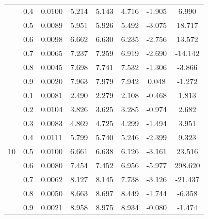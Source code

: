 \documentclass[11pt,a4paper]{report}
\begin{document}
\begin{longtable}{ | c | c || c | c | c | c | c | c | }
 & 0.4 & 0.0100 & 5.214 & 5.143 & 4.716 & -1.905 & 6.990 \\
 & 0.5 & 0.0089 & 5.951 & 5.926 & 5.492 & -3.075 & 18.717 \\
 & 0.6 & 0.0098 & 6.662 & 6.630 & 6.235 & -2.756 & 13.572 \\
 & 0.7 & 0.0065 & 7.237 & 7.259 & 6.919 & -2.690 & -14.142 \\
 & 0.8 & 0.0045 & 7.698 & 7.741 & 7.532 & -1.306 & -3.866 \\
 & 0.9 & 0.0020 & 7.963 & 7.979 & 7.942 & 0.048 & -1.272 \\
 \hline
\multirow{9}{*}{10} & 0.1 & 0.0081 & 2.490 & 2.279 & 2.108 & -0.468 & 1.813 \\
 & 0.2 & 0.0104 & 3.826 & 3.625 & 3.285 & -0.974 & 2.682 \\
 & 0.3 & 0.0083 & 4.869 & 4.725 & 4.299 & -1.494 & 3.951 \\
 & 0.4 & 0.0111 & 5.799 & 5.740 & 5.246 & -2.399 & 9.323 \\
 & 0.5 & 0.0100 & 6.661 & 6.638 & 6.126 & -3.161 & 23.516 \\
 & 0.6 & 0.0080 & 7.454 & 7.452 & 6.956 & -5.977 & 298.620 \\
 & 0.7 & 0.0062 & 8.127 & 8.145 & 7.738 & -3.126 & -21.437 \\
 & 0.8 & 0.0050 & 8.663 & 8.697 & 8.449 & -1.744 & -6.358 \\
 & 0.9 & 0.0021 & 8.958 & 8.975 & 8.934 & -0.080 & -1.474 \\
 \hline
\hline
\end{longtable}
\end{document}
